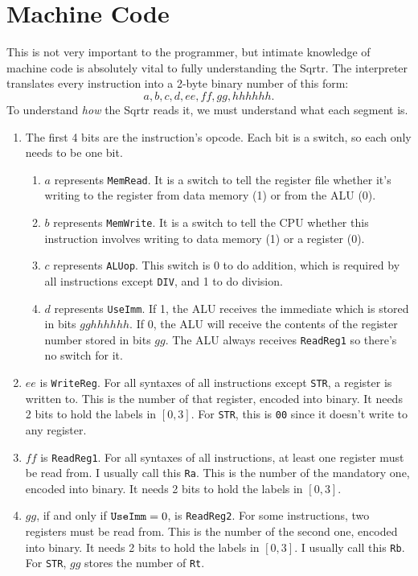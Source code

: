\documentclass[12pt, oneside]{memoir}
\newcommand{\R}[1]{{\color{register}\texttt{R#1}}}
\newcommand{\instruction}[1]{{\color{instruction}\texttt{#1}}}
\begin{document}
\chapter{Machine Code}
This is not very important to the programmer, but intimate knowledge of machine code is absolutely vital to fully understanding the Sqrtr. The interpreter translates every instruction into a 2-byte binary number of this form:
\begin{equation*}
    a,b,c,d,ee,ff,gg,hhhhhh.
\end{equation*}
To understand \textit{how} the Sqrtr reads it, we must understand what each segment is.
\begin{enumerate}
    \item The first 4 bits are the instruction's opcode. Each bit is a switch, so each only needs to be one bit.
    \begin{enumerate}
        \item$a$ represents \texttt{MemRead}. It is a switch to tell the register file whether it's writing to the register from data memory (1) or from the ALU (0).
        \item $b$ represents \texttt{MemWrite}. It is a switch to tell the CPU whether this instruction involves writing to data memory (1) or a register (0).
        \item $c$ represents \texttt{ALUop}. This switch is 0 to do addition, which is required by all instructions except \instruction{DIV}, and 1 to do division.
        \item $d$ represents \texttt{UseImm}. If 1, the ALU receives the immediate which is stored in bits $gghhhhhh$. If 0, the ALU will receive the contents of the register number stored in bits $gg$. The ALU always receives \texttt{ReadReg1} so there's no switch for it.
    \end{enumerate}
    \item $ee$ is \texttt{WriteReg}. For all syntaxes of all instructions except \instruction{STR}, a register is written to. This is the number of that register, encoded into binary. It needs 2 bits to hold the labels in $[0,3]$. For \instruction{STR}, this is \texttt{00} since it doesn't write to any register.
    \item $ff$ is \texttt{ReadReg1}. For all syntaxes of all instructions, at least one register must be read from. I usually call this \R{a}. This is the number of the mandatory one, encoded into binary. It needs 2 bits to hold the labels in $[0,3]$.
    \item $gg$, if and only if $\text{\texttt{UseImm}} = 0$, is \texttt{ReadReg2}. For some instructions, two registers must be read from. This is the number of the second one, encoded into binary. It needs 2 bits to hold the labels in $[0,3]$. I usually call this \R{b}. For \instruction{STR}, $gg$ stores the number of \R{t}.

\end{enumerate}
\end{document}
